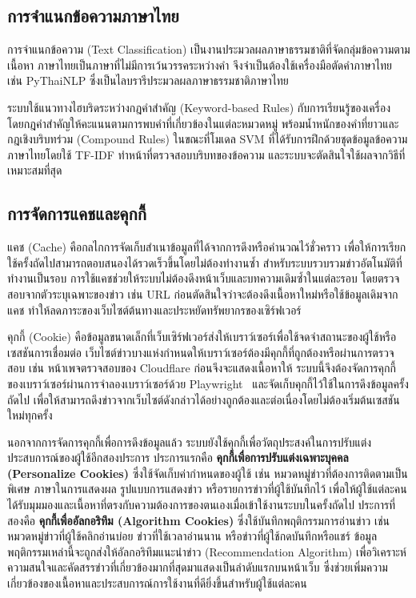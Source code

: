 \subsection{การจำแนกข้อความภาษาไทย}

การจำแนกข้อความ (Text Classification) เป็นงานประมวลผลภาษาธรรมชาติที่จัดกลุ่มข้อความตามเนื้อหา ภาษาไทยเป็นภาษาที่ไม่มีการเว้นวรรคระหว่างคำ จึงจำเป็นต้องใช้เครื่องมือตัดคำภาษาไทย เช่น PyThaiNLP ซึ่งเป็นไลบรารีประมวลผลภาษาธรรมชาติภาษาไทย~\cite{pythainlp2021}

ระบบใช้แนวทางไฮบริดระหว่างกฎคำสำคัญ (Keyword-based Rules) กับการเรียนรู้ของเครื่อง โดยกฎคำสำคัญให้คะแนนตามการพบคำที่เกี่ยวข้องในแต่ละหมวดหมู่ พร้อมน้ำหนักของคำที่ยาวและกฎเชิงบริบทร่วม (Compound Rules) ในขณะที่โมเดล SVM ที่ได้รับการฝึกด้วยชุดข้อมูลข้อความภาษาไทยโดยใช้ TF-IDF ทำหน้าที่ตรวจสอบบริบทของข้อความ และระบบจะตัดสินใจใช้ผลจากวิธีที่เหมาะสมที่สุด~\cite{scikit2024}

\subsection{การจัดการแคชและคุกกี้}

แคช (Cache) คือกลไกการจัดเก็บสำเนาข้อมูลที่ได้จากการดึงหรือคำนวณไว้ชั่วคราว เพื่อให้การเรียกใช้ครั้งถัดไปสามารถตอบสนองได้รวดเร็วขึ้นโดยไม่ต้องทำงานซ้ำ สำหรับระบบรวบรวมข่าวอัตโนมัติที่ทำงานเป็นรอบ การใช้แคชช่วยให้ระบบไม่ต้องดึงหน้าเว็บและบทความเดิมซ้ำในแต่ละรอบ โดยตรวจสอบจากตัวระบุเฉพาะของข่าว เช่น URL ก่อนตัดสินใจว่าจะต้องดึงเนื้อหาใหม่หรือใช้ข้อมูลเดิมจากแคช ทำให้ลดภาระของเว็บไซต์ต้นทางและประหยัดทรัพยากรของเซิร์ฟเวอร์

คุกกี้ (Cookie) คือข้อมูลขนาดเล็กที่เว็บเซิร์ฟเวอร์ส่งให้เบราว์เซอร์เพื่อใช้จดจำสถานะของผู้ใช้หรือเซสชันการเชื่อมต่อ เว็บไซต์ข่าวบางแห่งกำหนดให้เบราว์เซอร์ต้องมีคุกกี้ที่ถูกต้องหรือผ่านการตรวจสอบ เช่น หน้าเพจตรวจสอบของ Cloudflare ก่อนจึงจะแสดงเนื้อหาให้ ระบบนี้จึงต้องจัดการคุกกี้ของเบราว์เซอร์ผ่านการจำลองเบราว์เซอร์ด้วย Playwright~\cite{playwright2024} และจัดเก็บคุกกี้ไว้ใช้ในการดึงข้อมูลครั้งถัดไป เพื่อให้สามารถดึงข่าวจากเว็บไซต์ดังกล่าวได้อย่างถูกต้องและต่อเนื่องโดยไม่ต้องเริ่มต้นเซสชันใหม่ทุกครั้ง

นอกจากการจัดการคุกกี้เพื่อการดึงข้อมูลแล้ว ระบบยังใช้คุกกี้เพื่อวัตถุประสงค์ในการปรับแต่งประสบการณ์ของผู้ใช้อีกสองประการ ประการแรกคือ \textbf{คุกกี้เพื่อการปรับแต่งเฉพาะบุคคล (Personalize Cookies)} ซึ่งใช้จัดเก็บค่ากำหนดของผู้ใช้ เช่น หมวดหมู่ข่าวที่ต้องการติดตามเป็นพิเศษ ภาษาในการแสดงผล รูปแบบการแสดงข่าว หรือรายการข่าวที่ผู้ใช้บันทึกไว้ เพื่อให้ผู้ใช้แต่ละคนได้รับมุมมองและเนื้อหาที่ตรงกับความต้องการของตนเองเมื่อเข้าใช้งานระบบในครั้งถัดไป ประการที่สองคือ \textbf{คุกกี้เพื่ออัลกอริทึม (Algorithm Cookies)} ซึ่งใช้บันทึกพฤติกรรมการอ่านข่าว เช่น หมวดหมู่ข่าวที่ผู้ใช้คลิกอ่านบ่อย ข่าวที่ใช้เวลาอ่านนาน หรือข่าวที่ผู้ใช้กดบันทึกหรือแชร์ ข้อมูลพฤติกรรมเหล่านี้จะถูกส่งให้อัลกอริทึมแนะนำข่าว (Recommendation Algorithm) เพื่อวิเคราะห์ความสนใจและคัดสรรข่าวที่เกี่ยวข้องมากที่สุดมาแสดงเป็นลำดับแรกบนหน้าเว็บ ซึ่งช่วยเพิ่มความเกี่ยวข้องของเนื้อหาและประสบการณ์การใช้งานที่ดียิ่งขึ้นสำหรับผู้ใช้แต่ละคน

